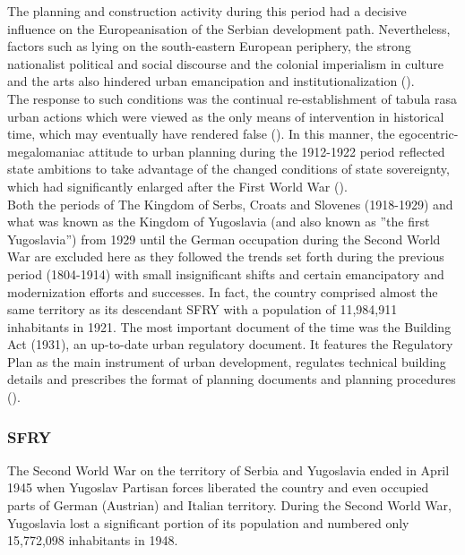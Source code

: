 \documentclass[11pt]{report}
\begin{document}
The planning and construction activity during this period had a decisive influence on the Europeanisation of the Serbian development path. Nevertheless, factors such as lying on the south-eastern European periphery, the strong nationalist political and social discourse and the colonial imperialism in culture and the arts also hindered urban emancipation and institutionalization (\href{Vukmirovic}{\citealt{vukmirovic_city_2013}}).
\\

The response to such conditions was the continual re-establishment of tabula rasa urban actions which were viewed as the only means of intervention in historical time, which may eventually have rendered false (\href{Blagojevic}{\citealt{blagojevic_urban_2009}}). In this manner, the egocentric-megalomaniac attitude to urban planning during the 1912-1922 period reflected state ambitions to take advantage of the changed conditions of state sovereignty, which had significantly enlarged after the First World War (\href{Blagojevic}{\citealt{blagojevic_urban_2009}}).
\\

Both the periods of The Kingdom of Serbs, Croats and Slovenes (1918-1929) and what was known as the Kingdom of Yugoslavia (and also known as ”the first Yugoslavia”) from 1929 until the German occupation during the Second World War are excluded here as they followed the trends set forth during the previous period (1804-1914) with small insignificant shifts and certain emancipatory and modernization efforts and successes. In fact, the country comprised almost the same  territory as its descendant SFRY with a population of 11,984,911 inhabitants in 1921. The most important document of the time was the Building Act (1931), an up-to-date urban regulatory document. It features the Regulatory Plan as the main instrument of urban development, regulates technical building details and prescribes the format of planning documents and planning procedures (\href{Nedovic}{\citealt{nedovicbudic_waves_2006}}).

\subsubsection{SFRY}

The Second World War on the territory of Serbia and Yugoslavia ended in April 1945 when Yugoslav Partisan forces liberated the country and even occupied parts of German (Austrian) and Italian territory. During the Second World War, Yugoslavia lost a significant portion of its population and numbered only 15,772,098 inhabitants in 1948.
\\
\end{document}

